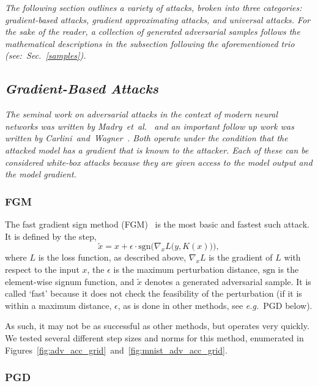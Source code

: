 \documentclass[journal]{IEEEtran}
\newcommand{\eg}{\textit{e.g.}\xspace}
\newcommand{\cm}[1]{\textit{{\color{blue}#1}}}
\begin{document}
\cm{The following section outlines a variety of attacks, broken into three categories: gradient-based attacks, gradient approximating attacks, and universal attacks. For the sake of the reader, a collection of generated adversarial samples follows the mathematical descriptions in the subsection following the aforementioned trio (see:~Sec.~\ref{samples}).}

\subsection{\cm{Gradient-Based Attacks}}

\cm{
The seminal work on adversarial attacks in the context of modern neural networks was written by Madry~et~al.~\cite{madry2017towards} and an important follow up work was written by Carlini~and~Wagner~\cite{carlini_towards_2017}. Both operate under the condition that the attacked model has a gradient that is known to the attacker. Each of these can be considered \textit{white-box} attacks because they are given access to the model output and the model gradient. 
}


\subsubsection{FGM}

The fast gradient sign method (FGM)~\cite{fgm} is the most basic and fastest such attack. It is defined by the step,
$$
   \widetilde{x} = x + \epsilon \cdot \textrm{sgn}\Big(\nabla_{x} L\big(y, K(x)\big)\Big),
$$
where $L$ is the loss function, as described above, $\nabla_{x} L$ is the gradient of $L$ with respect to the input $x$, the $\epsilon$ is the maximum perturbation distance, $\textrm{sgn}$ is the element-wise signum function, and $\widetilde{x}$ denotes a generated adversarial sample. It is called `fast' because it does not check the feasibility of the perturbation (if it is within a maximum distance, $\epsilon$, as is done in other methods, see \eg~PGD below).

As such, it may not be as successful as other methods, but operates very quickly. We tested several different step sizes and norms for this method, enumerated in Figures~\ref{fig:adv_acc_grid}~and~\ref{fig:mnist_adv_acc_grid}. 

\subsubsection{PGD}
\end{document}
